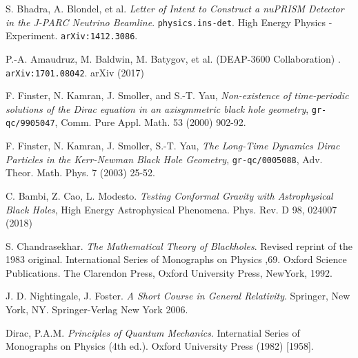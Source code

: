 \documentclass[12pt]{article}
\begin{document}
\newpage
\begin{thebibliography}{99}

  S. Bhadra, A. Blondel, et al. \textit{Letter of Intent to Construct a nuPRISM Detector in the J-PARC Neutrino Beamline}. \texttt{physics.ins-det}. High Energy Physics - Experiment. \texttt{arXiv:1412.3086}.

   P.-A. Amaudruz, M. Baldwin, M. Batygov, et al. (DEAP-3600 Collaboration) . \texttt{arXiv:1701.08042}. arXiv (2017)
  
  F. Finster, N. Kamran, J. Smoller, and S.-T. Yau, \textit{Non-existence of time-periodic solutions of the Dirac equation in an axisymmetric black hole geometry}, \texttt{gr-qc/9905047}, Comm. Pure Appl. Math. 53 (2000) 902-92.

  F. Finster, N. Kamran, J. Smoller, S.-T. Yau, \textit{The Long-Time Dynamics Dirac Particles in the Kerr-Newman Black Hole Geometry}, \texttt{gr-qc/0005088}, Adv. Theor. Math. Phys. 7 (2003) 25-52.

  C. Bambi, Z. Cao, L. Modesto. \textit{Testing Conformal Gravity with Astrophysical Black Holes}, High Energy Astrophysical Phenomena. Phys. Rev. D 98, 024007 (2018)

  S. Chandrasekhar. \textit{The Mathematical Theory of Blackholes}. Revised reprint of the 1983 original. International Series of Monographs on Physics ,69. Oxford Science Publications. The Clarendon Press, Oxford University Press, NewYork, 1992.	

  J. D. Nightingale, J. Foster. \textit{A Short Course in General Relativity}. Springer, New York, NY. Springer-Verlag New York 2006.

  Dirac, P.A.M. \textit{Principles of Quantum Mechanics}. Internatial Series of Monographs on Physics (4th ed.). Oxford University Press (1982) [1958].
  
\end{thebibliography}
\end{document}
